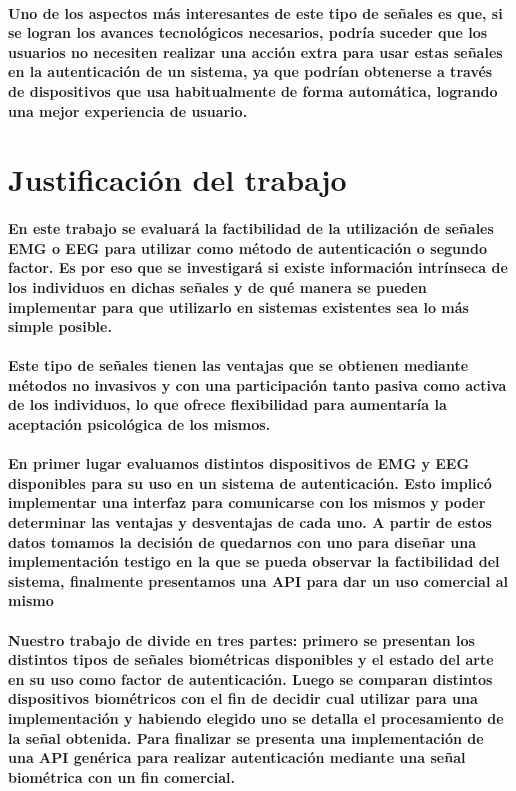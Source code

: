 \documentclass{article}
\begin{document}
\paragraph{
Uno de los aspectos más interesantes de este tipo de señales es que, si se logran los avances tecnológicos necesarios, podría suceder que los usuarios no necesiten realizar una acción extra para usar estas señales en la autenticación de un sistema, ya que podrían obtenerse a través de dispositivos que usa habitualmente de forma automática, logrando una mejor experiencia de usuario.
}
\section{Justificación del trabajo}
\paragraph{
En este trabajo se evaluará la factibilidad de la utilización de señales EMG o EEG para utilizar como método de autenticación o segundo factor. Es por eso que se investigará si existe información intrínseca de los individuos en dichas señales y de qué manera se pueden implementar para que utilizarlo en sistemas existentes sea lo más simple posible.
}
\paragraph{
Este tipo de señales tienen las ventajas que se obtienen mediante métodos no invasivos y con una participación tanto pasiva como activa de los individuos, lo que ofrece flexibilidad para aumentaría la aceptación psicológica de los mismos.
}
\paragraph{
En primer lugar evaluamos distintos dispositivos de EMG y EEG disponibles para su uso en un sistema de autenticación. Esto implicó implementar una interfaz para comunicarse con los mismos y poder determinar las ventajas y desventajas de cada uno. A partir de estos datos tomamos la decisión de quedarnos con uno para diseñar una implementación testigo en la que se pueda observar la factibilidad del sistema, finalmente presentamos una API para dar un uso comercial al mismo
}
\paragraph{
Nuestro trabajo de divide en tres partes: primero se presentan los distintos tipos de señales biométricas disponibles y el estado del arte en su uso como factor de autenticación. Luego se comparan distintos dispositivos biométricos con el fin de decidir cual utilizar para una implementación y habiendo elegido uno se detalla el procesamiento de la señal obtenida. Para finalizar se presenta una implementación de una API genérica para realizar autenticación mediante una señal biométrica con un fin comercial.
}
\end{document}
